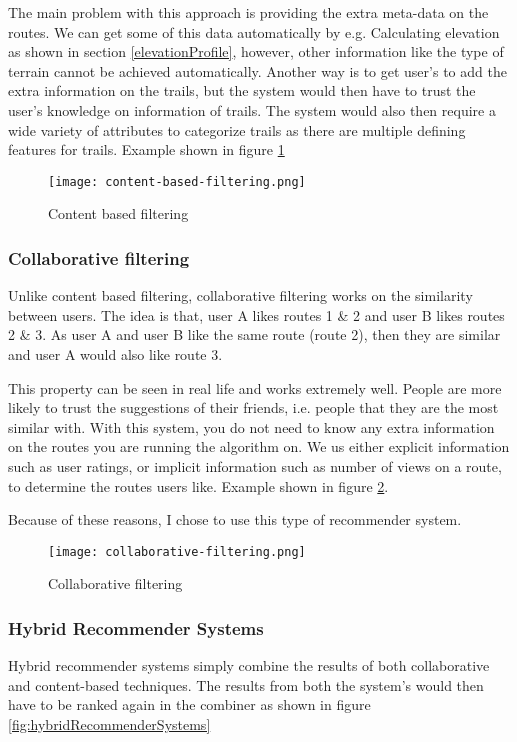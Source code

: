 The main problem with this approach is providing the extra meta-data on the routes. We can get some of this data automatically by e.g. Calculating elevation as shown in section \ref{elevationProfile}, however, other information like the type of terrain cannot be achieved automatically. Another way is to get user's to add the extra information on the trails, but the system would then have to trust the user's knowledge on information of trails. The system would also then require a wide variety of attributes to categorize trails as there are multiple defining features for trails. Example shown in figure \ref{fig:contentBasedFiltering}
\begin{figure}[ht]
    \centering
    \texttt{[image: content-based-filtering.png]}
    \caption{Content based filtering}
    \label{fig:contentBasedFiltering}
\end{figure}

\subsubsection{Collaborative filtering}
Unlike content based filtering, collaborative filtering works on the similarity between users. The idea is that, user A likes routes 1 \& 2 and user B likes routes 2 \& 3. As user A and user B like the same route (route 2), then they are similar and user A would also like route 3. 

This property can be seen in real life and works extremely well. People are more likely to trust the suggestions of their friends, i.e. people that they are the most similar with. With this system, you do not need to know any extra information on the routes you are running the algorithm on. We us either explicit information such as user ratings, or implicit information such as number of views on a route, to determine the routes users like. Example shown in figure \ref{fig:collaborativeFiltering}.

Because of these reasons, I chose to use this type of recommender system.

\begin{figure}[ht]
    \centering
    \texttt{[image: collaborative-filtering.png]}
    \caption{Collaborative filtering}
    \label{fig:collaborativeFiltering}
\end{figure}

\subsubsection{Hybrid Recommender Systems}
Hybrid recommender systems simply combine the results of both collaborative and content-based techniques. The results from both the system's would then have to be ranked again in the combiner as shown in figure \ref{fig:hybridRecommenderSystems}

